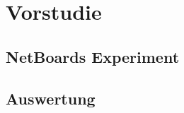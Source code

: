 \chapter{Vorstudie}\label{Vorstudie}
\section{NetBoards Experiment}\label{NetBoards Experiment}
\section{Auswertung}\label{Auswertung}
